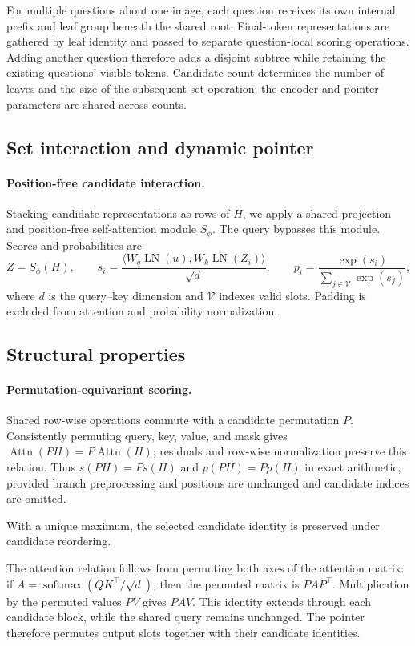 For multiple questions about one image, each question receives its own internal prefix and leaf group beneath the shared root. Final-token representations are gathered by leaf identity and passed to separate question-local scoring operations. Adding another question therefore adds a disjoint subtree while retaining the existing questions' visible tokens. Candidate count determines the number of leaves and the size of the subsequent set operation; the encoder and pointer parameters are shared across counts.

\subsection{Set interaction and dynamic pointer}
\paragraph{Position-free candidate interaction.}
Stacking candidate representations as rows of $H$, we apply a shared projection and position-free self-attention module $S_\phi$. The query bypasses this module. Scores and probabilities are
\begin{equation}
 Z=S_\phi(H),\qquad s_i=\frac{\langle W_q\operatorname{LN}(u), W_k\operatorname{LN}(Z_i)\rangle}{\sqrt{d}},\qquad p_i=\frac{\exp(s_i)}{\sum_{j\in\mathcal V}\exp(s_j)},
\end{equation}
where $d$ is the query--key dimension and $\mathcal V$ indexes valid slots. Padding is excluded from attention and probability normalization.

\subsection{Structural properties}
\paragraph{Permutation-equivariant scoring.}
Shared row-wise operations commute with a candidate permutation $P$. Consistently permuting query, key, value, and mask gives $\operatorname{Attn}(PH)=P\operatorname{Attn}(H)$; residuals and row-wise normalization preserve this relation. Thus $s(PH)=Ps(H)$ and $p(PH)=Pp(H)$ in exact arithmetic, provided branch preprocessing and positions are unchanged and candidate indices are omitted.

With a unique maximum, the selected candidate identity is preserved under candidate reordering.

The attention relation follows from permuting both axes of the attention matrix: if $A=\operatorname{softmax}(QK^\top/\sqrt d)$, then the permuted matrix is $PAP^\top$. Multiplication by the permuted values $PV$ gives $PAV$. This identity extends through each candidate block, while the shared query remains unchanged. The pointer therefore permutes output slots together with their candidate identities.

